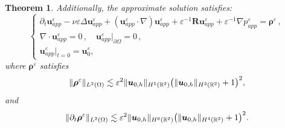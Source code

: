 \documentclass[10pt,a4paper]{amsart}
\newtheorem{theorem}{Theorem}
\begin{document}
\begin{theorem}
	Additionally, the approximate solution satisfies:
	\begin{equation}\label{1.19}
		\begin{cases}
			\partial_{t} {\boldsymbol u}_{app}^{\varepsilon}-\nu\varepsilon\Delta{\boldsymbol u}_{app}^{\varepsilon}+({\boldsymbol u}_{app}^{\varepsilon} \cdot \nabla) {\boldsymbol u}_{app}^{\varepsilon}+\varepsilon^{-1}\boldsymbol{R} {\boldsymbol u}_{app}^{\varepsilon}
			+\varepsilon^{-1}\nabla{p}_{app}^{\varepsilon}=\boldsymbol \rho^{\varepsilon}\,,\\
			\nabla\cdot {\boldsymbol u}_{app}^{\varepsilon}=0\,,\quad
			{\boldsymbol u}_{app}^{\varepsilon}|_{\partial\Omega}=0\,,\\
			{\boldsymbol u}_{app}^{\varepsilon}|_{t=0}=\boldsymbol{u}_0^\varepsilon,
		\end{cases}
	\end{equation}
	where $\boldsymbol \rho^{\varepsilon}$ satisfies
	\begin{equation*}
		\lVert
		\boldsymbol \rho^{\varepsilon}\rVert_{{L}^{2}(\Omega)}
		\lesssim
		\varepsilon^2
		\lVert
		{\boldsymbol{u}}_{0,h}
		\rVert_{{H}^{5}(\mathbb{R}^2)}
		\big(
		\lVert
		{\boldsymbol{u}}_{0,h}
		\rVert_{{H}^{3}(\mathbb{R}^2)}
		+1\big)^2
		\notag,
	\end{equation*}	
	and
	\begin{equation*}
		\lVert
		\partial_t\boldsymbol \rho^{\varepsilon}\rVert_{{L}^{2}(\Omega)}
		\lesssim
		\varepsilon^2
		\lVert
		{\boldsymbol{u}}_{0,h}
		\rVert_{{H}^{6}(\mathbb{R}^2)}
		\big(
		\lVert
		{\boldsymbol{u}}_{0,h}
		\rVert_{{H}^{4}(\mathbb{R}^2)}
		+1
		\big)^2
		\notag.
	\end{equation*}	
\end{theorem}
\end{document}
